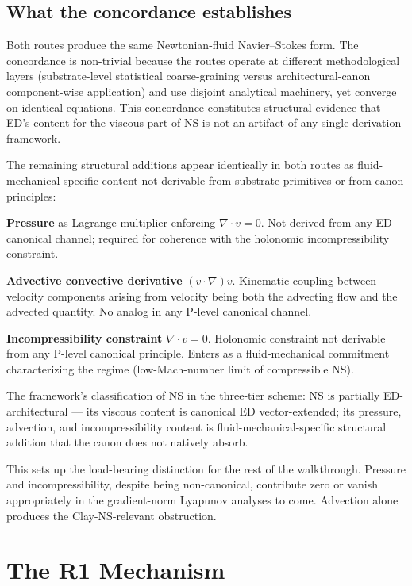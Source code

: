 \documentclass[11pt,a4paper]{article}
\begin{document}
\subsection{What the concordance establishes}

Both routes produce the same Newtonian-fluid Navier--Stokes form. The concordance is non-trivial because the routes operate at different methodological layers (substrate-level statistical coarse-graining versus architectural-canon component-wise application) and use disjoint analytical machinery, yet converge on identical equations. This concordance constitutes structural evidence that ED's content for the viscous part of NS is not an artifact of any single derivation framework.

The remaining structural additions appear identically in both routes as fluid-mechanical-specific content not derivable from substrate primitives or from canon principles:

\textbf{Pressure} as Lagrange multiplier enforcing $\nabla\cdot v = 0$. Not derived from any ED canonical channel; required for coherence with the holonomic incompressibility constraint.

\textbf{Advective convective derivative} $(v\cdot\nabla)v$. Kinematic coupling between velocity components arising from velocity being both the advecting flow and the advected quantity. No analog in any P-level canonical channel.

\textbf{Incompressibility constraint} $\nabla\cdot v = 0$. Holonomic constraint not derivable from any P-level canonical principle. Enters as a fluid-mechanical commitment characterizing the regime (low-Mach-number limit of compressible NS).

The framework's classification of NS in the three-tier scheme: NS is partially ED-architectural --- its viscous content is canonical ED vector-extended; its pressure, advection, and incompressibility content is fluid-mechanical-specific structural addition that the canon does not natively absorb.

This sets up the load-bearing distinction for the rest of the walkthrough. Pressure and incompressibility, despite being non-canonical, contribute zero or vanish appropriately in the gradient-norm Lyapunov analyses to come. Advection alone produces the Clay-NS-relevant obstruction.

\section{The R1 Mechanism}
\end{document}
